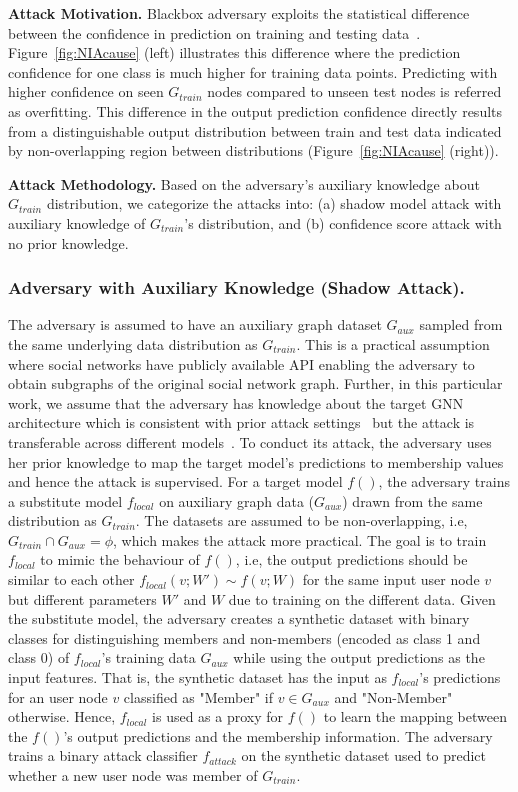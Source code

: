 \noindent\textbf{Attack Motivation.} Blackbox adversary exploits the statistical difference between the confidence in prediction on training and testing data~\cite{membershipinf}. %
Figure~\ref{fig:NIAcause} (left) illustrates this difference where the prediction confidence for one class is much higher for training data points.
Predicting with higher confidence on seen $G_{train}$ nodes compared to unseen test nodes is referred as overfitting.
This difference in the output prediction confidence directly results from a distinguishable output distribution between train and test data indicated by non-overlapping region between distributions (Figure~\ref{fig:NIAcause} (right)).


\noindent\textbf{Attack Methodology.} Based on the adversary's auxiliary knowledge about $G_{train}$ distribution, we categorize the attacks into: (a) shadow model attack with auxiliary knowledge of $G_{train}$'s distribution, and (b) confidence score attack with no prior knowledge.

\noindent\subsubsection{Adversary with Auxiliary Knowledge (Shadow Attack).} The adversary is assumed to have an auxiliary graph dataset $G_{aux}$ sampled from the same underlying data distribution as $G_{train}$.
This is a practical assumption where social networks have publicly available API enabling the adversary to obtain subgraphs of the original social network graph.
Further, in this particular work, we assume that the adversary has knowledge about the target GNN architecture which is consistent with prior attack settings~\cite{membershipinf,attributeinf,attributeinf2,logan} but the attack is transferable across different models~\cite{ndss19salem}.
To conduct its attack, the adversary uses her prior knowledge to map the target model's predictions to membership values and hence the attack is supervised.
For a target model $f()$, the adversary trains a substitute model $f_{local}$ on auxiliary graph data ($G_{aux}$) drawn from the same distribution as $G_{train}$.
The datasets are assumed to be non-overlapping, i.e, $G_{train} \cap G_{aux} = \phi$, which makes the attack more practical.
The goal is to train $f_{local}$ to mimic the behaviour of $f()$, i.e, the output predictions should be similar to each other $f_{local}(v;W') \sim f(v;W)$ for the same input user node $v$ but different parameters $W'$ and $W$ due to training on the different data.
Given the substitute model, the adversary creates a synthetic dataset with binary classes for distinguishing members and non-members (encoded as class 1 and class 0) of $f_{local}$'s training data $G_{aux}$ while using the output predictions as the input features.
That is, the synthetic dataset has the input as $f_{local}$'s predictions for an user node $v$ classified as "Member" if $v \in G_{aux}$ and "Non-Member" otherwise.
Hence, $f_{local}$ is used as a proxy for $f()$ to learn the mapping between the $f()$'s output predictions and the membership information.
The adversary trains a binary attack classifier $f_{attack}$ on the synthetic dataset used to predict whether a new user node was member of $G_{train}$.


